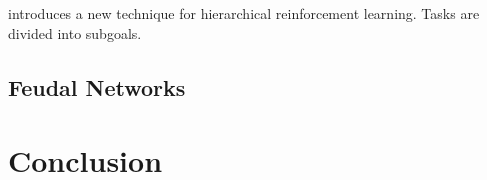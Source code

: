 \documentclass[runningheads]{llncs}
\begin{document}
\cite{levy2017hierarchical} introduces a new technique for hierarchical reinforcement learning. Tasks are divided into subgoals.

\subsection{Feudal Networks}

\cite{vezhnevets2017feudal}

\section{Conclusion}

%
%
%
% 
% 
%



\end{document}
